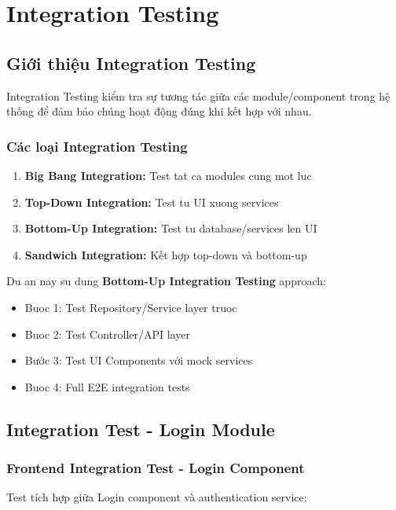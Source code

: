 \section{Integration Testing}

\subsection{Giới thiệu Integration Testing}
Integration Testing kiểm tra sự tương tác giữa các module/component trong hệ thống để đảm bảo chúng hoạt động đúng khi kết hợp với nhau.

\subsubsection{Các loại Integration Testing}
\begin{enumerate}
    \item \textbf{Big Bang Integration:} Test tat ca modules cung mot luc
    \item \textbf{Top-Down Integration:} Test tu UI xuong services
    \item \textbf{Bottom-Up Integration:} Test tu database/services len UI
    \item \textbf{Sandwich Integration:} Kết hợp top-down và bottom-up
\end{enumerate}

Du an nay su dung \textbf{Bottom-Up Integration Testing} approach:
\begin{itemize}
    \item Buoc 1: Test Repository/Service layer truoc
    \item Buoc 2: Test Controller/API layer
    \item Bước 3: Test UI Components với mock services
    \item Buoc 4: Full E2E integration tests
\end{itemize}

\subsection{Integration Test - Login Module}

\subsubsection{Frontend Integration Test - Login Component}
Test tích hợp giữa Login component và authentication service:

